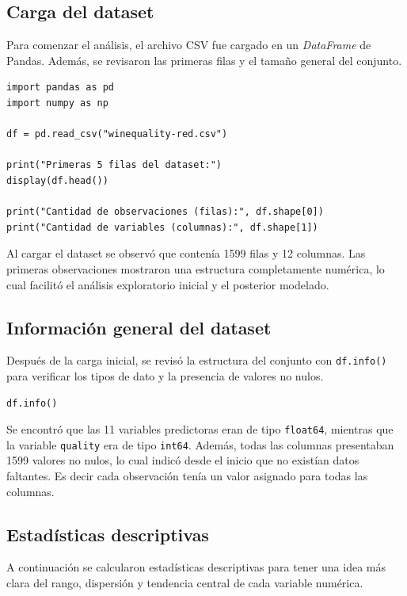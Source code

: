 \documentclass[conference]{IEEEtran}
\begin{document}
\subsection{Carga del dataset}

Para comenzar el análisis, el archivo CSV fue cargado en un \textit{DataFrame} de Pandas. Además, se revisaron las primeras filas y el tamaño general del conjunto.

\begin{lstlisting}[caption={Carga inicial del dataset}, label={lst:carga}]
import pandas as pd
import numpy as np

df = pd.read_csv("winequality-red.csv")

print("Primeras 5 filas del dataset:")
display(df.head())

print("Cantidad de observaciones (filas):", df.shape[0])
print("Cantidad de variables (columnas):", df.shape[1])
\end{lstlisting}

Al cargar el dataset se observó que contenía 1599 filas y 12 columnas. Las primeras observaciones mostraron una estructura completamente numérica, lo cual facilitó el análisis exploratorio inicial y el posterior modelado.

\subsection{Información general del dataset}

Después de la carga inicial, se revisó la estructura del conjunto con \texttt{df.info()} para verificar los tipos de dato y la presencia de valores no nulos.

\begin{lstlisting}[caption={Información general del dataset}, label={lst:info}]
df.info()
\end{lstlisting}

Se encontró que las 11 variables predictoras eran de tipo \texttt{float64}, mientras que la variable \texttt{quality} era de tipo \texttt{int64}. Además, todas las columnas presentaban 1599 valores no nulos, lo cual indicó desde el inicio que no existían datos faltantes. Es decir cada observación tenía un valor asignado para todas las columnas.

\subsection{Estadísticas descriptivas}

A continuación se calcularon estadísticas descriptivas para tener una idea más clara del rango, dispersión y tendencia central de cada variable numérica.
\end{document}
